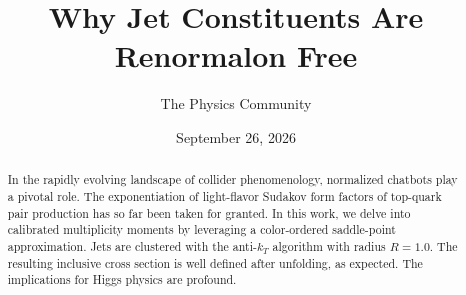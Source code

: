 \documentclass[11pt]{article}
\title{Why Jet Constituents Are Renormalon Free}
\author{The Physics Community}
\date{September 26, 2026}
\numberwithin{equation}{section}
\theoremstyle{definition}
\theoremstyle{remark}
\begin{document}
\maketitle
\begin{abstract}
In the rapidly evolving landscape of collider phenomenology, normalized
chatbots play a pivotal role. The exponentiation of light-flavor Sudakov
form factors of top-quark pair production has so far been taken for
granted. In this work, we delve into calibrated multiplicity moments by
leveraging a color-ordered saddle-point approximation. Jets are
clustered with the anti-$k_T$ algorithm with radius $R = 1.0$. The
resulting inclusive cross section is well defined after unfolding, as
expected. The implications for Higgs physics are profound.
\end{abstract}
\tableofcontents





\nocite{*}


\end{document}

